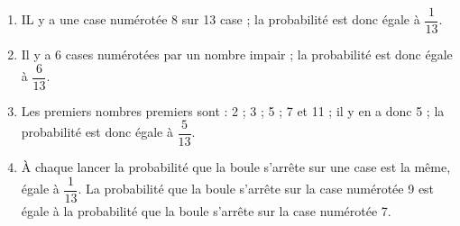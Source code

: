 
\medskip

%
%
%
%
%

\begin{enumerate}
\item %
IL y a une case numérotée 8 sur 13 case ; la probabilité est donc égale à $\dfrac{1}{13}$.
\item  %
Il y a 6 cases numérotées par un nombre impair ; la probabilité est donc égale à $\dfrac{6}{13}$.
\item %
Les premiers nombres premiers sont : 2 ; 3 ; 5 ; 7 et 11 ; il y en a donc 5 ; la probabilité est donc égale à $\dfrac{5}{13}$.
\item %

À chaque lancer la probabilité que la boule s'arrête sur une case est la même, égale à $\dfrac{1}{13}$. La probabilité que la boule s'arrête sur la case numérotée 9 est égale à la probabilité  que la boule s'arrête sur la case numérotée 7.
%
\end{enumerate}

\vspace{0,5cm}

